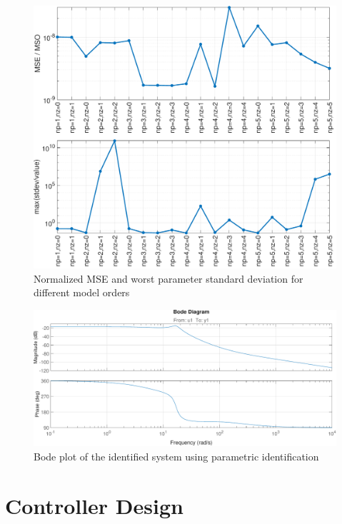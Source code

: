 \documentclass[11pt]{article}
\begin{document}
\begin{figure}[!ht]
\centering
\includegraphics[width=\textwidth]{sysid-errors-fig.pdf}
\caption{Normalized MSE and worst parameter standard deviation for different model orders}
\label{fig:errors-param}
\end{figure}


\begin{figure}[!ht]
\centering
\includegraphics[width=\textwidth]{bodeid-param.pdf}
\caption{Bode plot of the identified system using parametric identification}
\label{fig:bodeid_param}
\end{figure}

\section{Controller Design}
\label{sec:control}
\end{document}
